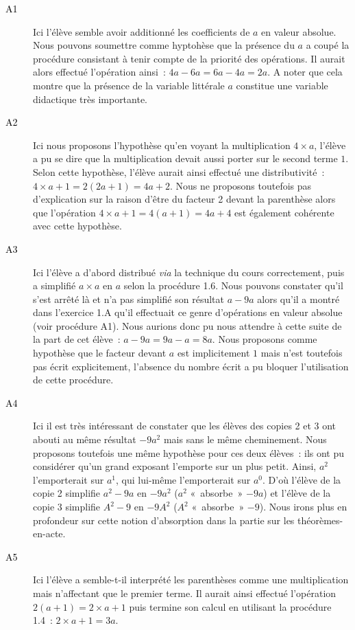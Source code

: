 \documentclass{report}
\theoremstyle{definition}
\begin{document}
\begin{description}
\item[\textcolor{black}{A1}] Ici l'élève semble avoir additionné les coefficients de $a$ en valeur absolue. Nous pouvons soumettre comme hyptohèse que la présence du $a$ a coupé la procédure consistant à tenir compte de la priorité des opérations. Il aurait alors effectué l'opération ainsi~: $4a-6a=6a-4a=2a$. A noter que cela montre que la présence de la variable littérale $a$ constitue une variable didactique très importante.

\item[\textcolor{black}{A2}] Ici nous proposons l'hypothèse qu'en voyant la multiplication $4\times a$, l'élève a pu se dire que la multiplication devait aussi porter sur le second terme $1$. Selon cette hypothèse, l'élève aurait ainsi effectué une distributivité~: $4\times a+1=2(2a+1)=4a+2$. Nous ne proposons toutefois pas d'explication sur la raison d'être du facteur 2 devant la parenthèse alors que l'opération $4\times a+1=4(a+1)=4a+4$ est également cohérente avec cette hypothèse.

\item[\textcolor{black}{A3}] Ici l'élève a d'abord distribué \textit{via} la technique du cours correctement, puis a simplifié $a\times a$ en $a$ selon la procédure 1.6. Nous pouvons constater qu'il s'est arrêté là et n'a pas simplifié son résultat $a-9a$ alors qu'il a montré dans l'exercice 1.A qu'il effectuait ce genre d'opérations en valeur absolue (voir procédure A1). Nous aurions donc pu nous attendre à cette suite de la part de cet élève~: $a-9a=9a-a=8a$. Nous proposons comme hypothèse que le facteur devant $a$ est implicitement $1$ mais n'est toutefois pas écrit explicitement, l'absence du nombre écrit a pu bloquer l'utilisation de cette procédure.

\item[\textcolor{black}{A4}] Ici il est très intéressant de constater que les élèves des copies 2 et 3 ont abouti au même résultat $-9a^2$ mais sans le même cheminement. Nous proposons toutefois une même hypothèse pour ces deux élèves~: ils ont pu considérer qu'un grand exposant l'emporte sur un plus petit. Ainsi, $a^2$ l'emporterait sur $a^1$, qui lui-même l'emporterait sur $a^0$. D'où l'élève de la copie 2 simplifie $a^2-9a$ en $-9a^2$ ($a^2$ «~absorbe~» $-9a$) et l'élève de la copie 3 simplifie $A^2-9$ en $-9A^2$ ($A^2$ «~absorbe~» $-9$). Nous irons plus en profondeur sur cette notion d'absorption dans la partie sur les théorèmes-en-acte.

\item[\textcolor{black}{A5}] Ici l'élève a semble-t-il interprété les parenthèses comme une multiplication mais n'affectant que le premier terme. Il aurait ainsi effectué l'opération $2(a+1)=2\times a + 1$ puis termine son calcul en utilisant la procédure 1.4~: $2\times a +1=3a$. 
\end{description}
\end{document}
